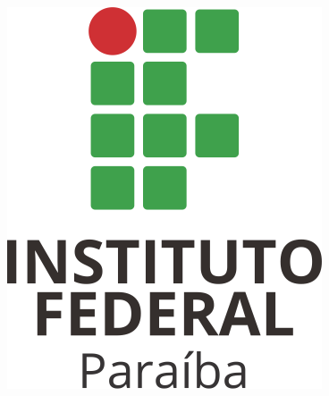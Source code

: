 
\frenchspacing 

\newpage

\pretextual

\begin{capa} 
   \center
   \begin{figure}[htp]
	\centering
	\includegraphics[width = 0.22\linewidth]{imagens/IFPB.png}
\end{figure}
   \ABNTEXchapterfont\large\bfseries{\imprimirinstituicao} 
   \vfill
   \vspace*{2cm}
   \begin{center}
   \ABNTEXchapterfont\Large\bfseries{\MakeUppercase{\imprimirtitulo}}
   \end{center}
   \vfill
   \vfill
    \vspace*{2cm}
   \ABNTEXchapterfont\large\bfseries\textsc{\MakeUppercase{\imprimirautor}}
   \vfill
   \vspace*{4cm}
   \large\bfseries\MakeTextUppercase{\imprimirlocal} \\
   \large\bfseries\imprimirdata
   \vspace*{1cm}
\end{capa}

